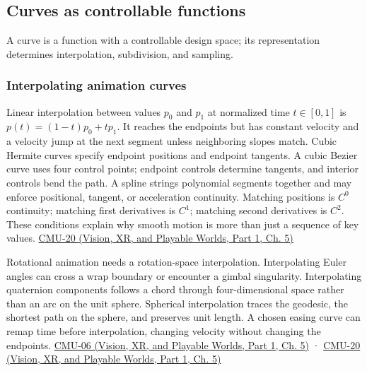 \subsection{Curves as controllable functions}\label{03-visual-computing-i-ch001-curves-as-controllable-functions}

\hypertarget{03-visual-computing-i-ch001-curves-as-controllable-functions}{}

A curve is a function with a controllable design space; its representation determines interpolation, subdivision, and sampling.

\subsubsection{Interpolating animation curves}\label{03-visual-computing-i-ch001-interpolating-animation-curves}

\hypertarget{03-visual-computing-i-ch001-interpolating-animation-curves}{}

Linear interpolation between values \(p_0\) and \(p_1\) at normalized time \(t\in[0,1]\) is \(p(t)=(1-t)p_0+tp_1\). It reaches the endpoints but has constant velocity and a velocity jump at the next segment unless neighboring slopes match. Cubic Hermite curves specify endpoint positions and endpoint tangents. A cubic Bezier curve uses four control points; endpoint controls determine tangents, and interior controls bend the path. A spline strings polynomial segments together and may enforce positional, tangent, or acceleration continuity. Matching positions is \(C^0\) continuity; matching first derivatives is \(C^1\); matching second derivatives is \(C^2\). These conditions explain why smooth motion is more than just a sequence of key values. \href{../07-Vision-XR-and-Playable-Worlds-P01/main.pdf\#04-visual-computing-ii-ch036-cmu-20---introduction-to-animation}{CMU-20 (Vision, XR, and Playable Worlds, Part 1, Ch. 5)}

Rotational animation needs a rotation-space interpolation. Interpolating Euler angles can cross a wrap boundary or encounter a gimbal singularity. Interpolating quaternion components follows a chord through four-dimensional space rather than an arc on the unit sphere. Spherical interpolation traces the geodesic, the shortest path on the sphere, and preserves unit length. A chosen easing curve can remap time before interpolation, changing velocity without changing the endpoints. \href{../07-Vision-XR-and-Playable-Worlds-P01/main.pdf\#04-visual-computing-ii-ch036-cmu-06---3d-rotations-and-complex-representations}{CMU-06 (Vision, XR, and Playable Worlds, Part 1, Ch. 5)} · \href{../07-Vision-XR-and-Playable-Worlds-P01/main.pdf\#04-visual-computing-ii-ch036-cmu-20---introduction-to-animation}{CMU-20 (Vision, XR, and Playable Worlds, Part 1, Ch. 5)}

